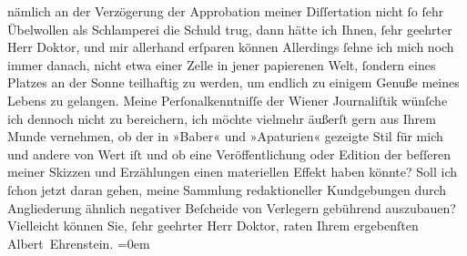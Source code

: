 \begin{ledgroupsized}[t]{13cm}
               nämlich an der Verzögerung der Approbation {\pb}meiner Diſſertation nicht ſo
               ſehr Übelwollen als Schlamperei die Schuld trug, dann hätte ich Ihnen, ſehr geehrter
               Herr Doktor, und mir allerhand erſparen können{\dotsfour} Allerdings
               ſehne ich mich noch immer danach, nicht etwa einer Zelle in jener papierenen Welt,
               ſondern eines Platzes an der Sonne teilhaftig zu werden, um endlich zu einigem Genuße
               meines Lebens zu gelangen. Meine Perſonalkenntniſſe der Wiener Journaliſtik wünſche ich dennoch nicht zu bereichern, ich möchte
               vielmehr äußerſt gern aus Ihrem Munde vernehmen, ob der in »Baber« und »Apaturien«
               gezeigte Stil für mich und andere von Wert iſt und ob eine Veröffentlichung oder
               Edition der beſſeren meiner Skizzen und Erzählungen einen materiellen Effekt haben
               könnte? Soll ich ſchon jetzt daran gehen, meine Sammlung redaktioneller Kundgebungen
               durch Angliederung ähnlich negativer Beſcheide von Verlegern gebührend auszubauen?
               Vielleicht können Sie, ſehr geehrter Herr Doktor, raten\pend
           \pstart
           Ihrem ergebenſten{\\[\baselineskip]}\spacefill\mbox{Albert Ehrenstein.}\pend
           \leftskip=0em{}
         
         \endnumbering{}\end{ledgroupsized}  \newcommand{\dateiname}{L01880}\newcommand{\titel}{Albert Ehrenstein an Arthur Schnitzler, 17. 10. 1909}\newcommand{\editorInnen}{Martin Anton Müller und Gerd-Hermann Susen}
      